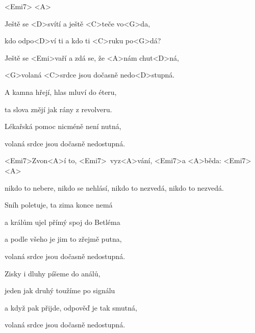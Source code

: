 

<Emi7>
<A>

\zs
Ještě se <D>svítí a ještě <C>teče vo<G>da,

kdo odpo<D>ví ti a kdo ti <C>ruku po<G>dá?

Ještě se <Emi>vaří a zdá se, že <A>nám chut<D>ná,

<G>volaná <C>srdce jsou dočasně nedo<D>stupná.
\ks

\zs
A kamna hřejí, hlas mluví do éteru,

ta slova znějí jak rány z revolveru.

Lékařská pomoc nicméně není nutná,

volaná srdce jsou dočasně nedostupná.
\ks

\zr
<Emi7>Zvon<A>í to, <Emi7>~vyz<A>vání, <Emi7>a <A>běda: <Emi7>~ <A>~

nikdo to nebere,
nikdo se nehlásí,
nikdo to nezvedá,
nikdo to nezvedá.
\kr

\zs
Sníh poletuje, ta zima konce nemá

a králům ujel přímý spoj do Betléma

a podle všeho je jim to zřejmě putna,

volaná srdce jsou dočasně nedostupná.
\ks

\zr \kr

\zs
Zisky i dluhy píšeme do análů,

jeden jak druhý toužíme po signálu

a když pak přijde, odpověď je tak smutná,

volaná srdce jsou dočasně nedostupná.
\ks

\zr \kr


\kp
